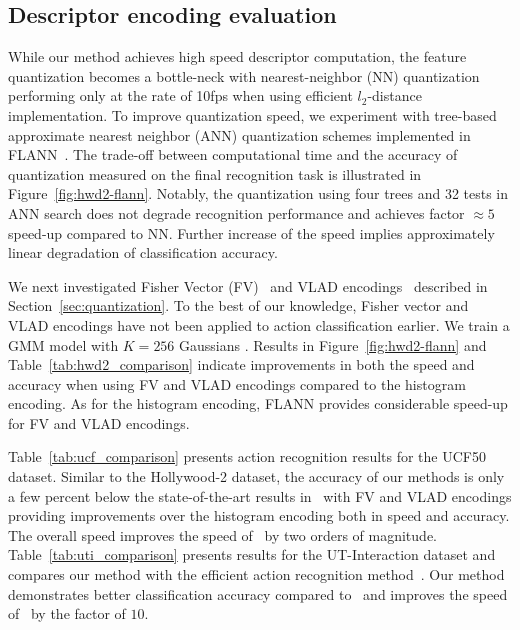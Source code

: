 \documentclass[10pt,twocolumn,letterpaper]{article}
\begin{document}
\subsection{Descriptor encoding evaluation}
\label{subsec:descencimprov}
While our method achieves high speed descriptor computation, the feature quantization becomes a bottle-neck with nearest-neighbor (NN) quantization performing only at the rate of 10fps when using efficient $l_2$-distance implementation. To improve quantization speed, we experiment with tree-based approximate nearest neighbor (ANN) quantization schemes implemented in FLANN~\cite{Muja09}. The trade-off between computational time and the accuracy of quantization measured on the final recognition task is illustrated in Figure~\ref{fig:hwd2-flann}. Notably, the quantization using four trees and 32 tests in ANN search does not degrade recognition performance and achieves factor $\approx5$ speed-up compared to NN. Further increase of the speed implies approximately linear degradation of classification accuracy. 

We next investigated Fisher Vector (FV)~\cite{Perronnin12} and VLAD encodings~\cite{Jegou10} described in Section~\ref{sec:quantization}. 
%
To the best of our knowledge, Fisher vector and VLAD encodings have not been applied to action classification earlier. We train a GMM model with $K=256$ Gaussians \cite{Jegou12}. Results in Figure~\ref{fig:hwd2-flann} and Table~\ref{tab:hwd2_comparison} indicate improvements in both the speed and accuracy when using FV and VLAD encodings compared to the histogram encoding. As for the histogram encoding, FLANN provides considerable speed-up for FV and VLAD encodings.

Table~\ref{tab:ucf_comparison} presents action recognition results for the UCF50 dataset. Similar to the Hollywood-2 dataset, the accuracy of our methods is only a few percent below the state-of-the-art results in~\cite{Wang12} with FV and VLAD encodings providing improvements over the histogram encoding both in speed and accuracy. The overall speed improves the speed of~\cite{Wang12} by two orders of magnitude. Table~\ref{tab:uti_comparison} presents results for the UT-Interaction dataset and compares our method with the efficient action recognition method~\cite{Yu10}. Our method demonstrates better classification accuracy compared to~\cite{Yu10} and improves the speed of~\cite{Yu10} by the factor of $10$.
\end{document}
